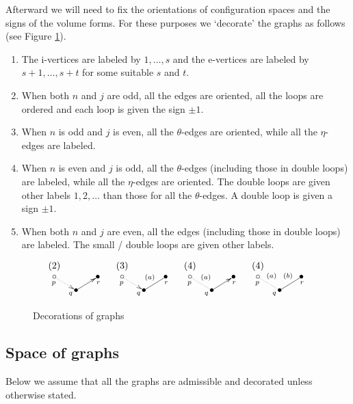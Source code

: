 Afterward we will need to fix the orientations of configuration spaces and the signs of the volume forms.
For these purposes we `decorate' the graphs as follows (see Figure \ref{fig_decoration}).
\begin{enumerate}
\item
 The i-vertices are labeled by $1,\dots ,s$ and the e-vertices are labeled by $s+1,\dots ,s+t$ for some suitable $s$
 and $t$.
\item
 When both $n$ and $j$ are odd, all the edges are oriented, all the loops are ordered and each loop is given the sign
 $\pm 1$.
\item
 When $n$ is odd and $j$ is even, all the $\theta$-edges are oriented, while all the $\eta$-edges are labeled.
\item
 When $n$ is even and $j$ is odd, all the $\theta$-edges (including those in double loops) are labeled, while all the
 $\eta$-edges are oriented.
 The double loops are given other labels $1,2,\dots$ than those for all the $\theta$-edges.
 A double loop is given a sign $\pm 1$.
\item
 When both $n$ and $j$ are even, all the edges (including those in double loops) are labeled.
 The small / double loops are given other labels.
\end{enumerate}
\begin{figure}[htb]
\[
 \begin{xy}
  (0,9)*{(2)},(0,5)*{\circ}="A", (8,0)*{\bullet}="B", (16,5)*{\bullet}="C",
  {\ar@{.>}"A";"B"_<{p}_>{q}},{\ar "B";"C"_>{r}},
  (25,9)*{(3)},(25,5)*{\circ}="D", (33,0)*{\bullet}="E", (41,5)*{\bullet}="F",
  {\ar@{.>}"D";"E"_<{p}_>{q}},{\ar@{-} "E";"F"^(.5){(a)}_>{r}},
  (50,9)*{(4)},(50,5)*{\circ}="G", (58,0)*{\bullet}="H", (66,5)*{\bullet}="I",
  {\ar@{.}"G";"H"_<{p}^(.5){(a)}_>{q}},{\ar "H";"I"_>{r}},
  (75,9)*{(4)},(75,5)*{\circ}="J", (83,0)*{\bullet}="K", (91,5)*{\bullet}="L",
  {\ar@{.}"J";"K"_<{p}^(.4){(a)}_>{q}},{\ar@{-} "K";"L"^(.6){(b)}_>{r}},
 \end{xy}
\]
\caption{Decorations of graphs}\label{fig_decoration}
\end{figure}





\subsection{Space of graphs}\label{subsection_space_of_graph}


Below we assume that all the graphs are admissible and decorated unless otherwise stated.


